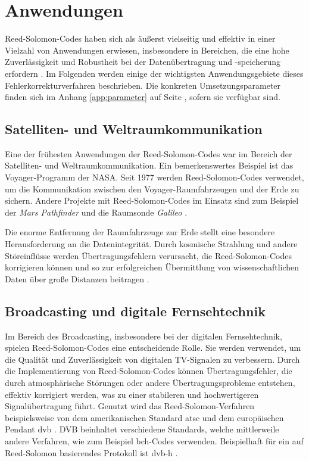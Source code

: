 \chapter{Anwendungen}\label{ch:application}

Reed-Solomon-Codes haben sich als äußerst vielseitig und effektiv in einer Vielzahl von Anwendungen erwiesen, insbesondere in Bereichen, die eine hohe Zuverlässigkeit und Robustheit bei der Datenübertragung und -speicherung erfordern \cite{WasIstReedSolomonVerfahren2022}. 
Im Folgenden werden einige der wichtigsten Anwendungsgebiete dieses Fehlerkorrekturverfahren beschrieben.
Die konkreten Umsetzungsparameter finden sich im Anhang \ref{app:parameter} auf Seite \pageref{app:parameter}, sofern sie verfügbar sind.

\section{Satelliten- und Weltraumkommunikation}

Eine der frühesten Anwendungen der Reed-Solomon-Codes war im Bereich der Satelliten- und Weltraumkommunikation. 
Ein bemerkenswertes Beispiel ist das Voyager-Programm der \mbox{NASA}. Seit 1977 werden Reed-Solomon-Codes verwendet, um die Kommunikation zwischen den Voyager-Raumfahrzeugen und der Erde zu sichern. 
Andere Projekte mit Reed-Solomon-Codes im Einsatz sind zum Beispiel der \textit{Mars Pathfinder} und die Raumsonde \textit{Galileo} \cite[Kapitel 3]{wickerReedSolomonCodes1994}.

Die enorme Entfernung der Raumfahrzeuge zur Erde stellt eine besondere Herausforderung an die Datenintegrität. 
Durch kosmische Strahlung und andere Störeinflüsse werden Übertragungsfehlern verursacht, die Reed-Solomon-Codes korrigieren können und  so zur erfolgreichen Übermittlung von wissenschaftlichen Daten über große Distanzen beitragen \cite[Kapitel 5]{ludwigVoyagerTelecommunications2002}.

\section{Broadcasting und digitale Fernsehtechnik}

Im Bereich des Broadcasting, insbesondere bei der digitalen Fernsehtechnik, spielen Reed-Solomon-Codes eine entscheidende Rolle. 
Sie werden verwendet, um die Qualität und Zuverlässigkeit von digitalen TV-Signalen zu verbessern. 
Durch die Implementierung von Reed-Solomon-Codes können Übertragungsfehler, die durch atmosphärische Störungen oder andere Übertragungsprobleme entstehen, effektiv korrigiert werden, was zu einer stabileren und hochwertigeren Signalübertragung führt.
Genutzt wird das Reed-Solomon-Verfahren beispielsweise von dem amerikanischen Standard \acrfull{atsc} und dem europäischen Pendant \acrfull{dvb} \cite{ilievAnalysisEvaluationReedSolomon2008}.
DVB beinhaltet verschiedene Standards, welche mittlerweile andere Verfahren, wie zum Beispiel \acrshort{bch}-Codes verwenden. 
Beispielhaft für ein auf Reed-Solomon basierendes Protokoll ist \acrshort{dvb-h} \cite{DVBH2024}. 

